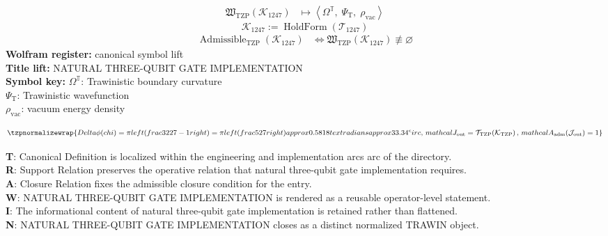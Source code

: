 \noindent
\begin{minipage}[t]{0.48\linewidth}
\begingroup
\small
\[
\begin{aligned}
\mathfrak{W}_{\mathrm{TZP}}\!\left(\mathcal{K}_{1247}\right)
&\longmapsto
\left\langle \Omega^{\mathbb{T}},\; \Psi_{\mathrm{T}},\; \rho_{\mathrm{vac}} \right\rangle
\end{aligned}
\]
\[
\mathcal{K}_{1247}
:=
\operatorname{HoldForm}\!\left(\mathcal{T}_{1247}\right)
\]
\[
\begin{aligned}
\operatorname{Admissible}_{\mathrm{TZP}}\!\left(\mathcal{K}_{1247}\right)
&\Longleftrightarrow
\mathfrak{W}_{\mathrm{TZP}}\!\left(\mathcal{K}_{1247}\right)\not\equiv\varnothing
\end{aligned}
\]
\textbf{Wolfram register:} canonical symbol lift\\
\textbf{Title lift:} NATURAL THREE-QUBIT GATE IMPLEMENTATION\\
\textbf{Symbol key:} \(\Omega^{\mathbb{T}}\): Trawinistic boundary curvature\\ \(\Psi_{\mathrm{T}}\): Trawinistic wavefunction\\ \(\rho_{\mathrm{vac}}\): vacuum energy density
\par
\endgroup
\end{minipage}\hfill
\begin{minipage}[t]{0.48\linewidth}
\[
\tzpnormalizewrap{Delta \phi( chi) = \pi left( frac{32}{27} - 1 right) = \pi left( frac{5}{27} right) approx 0.5818 text{ radians} approx 33.34^ circ,\,mathcal{J}_{\mathrm{out}} = \mathcal{T}_{\mathrm{TZP}}\!\left(\mathcal{K}_{\mathrm{TZP}}\right),\,mathcal{A}_{\mathrm{adm}}\!\left(\mathcal{J}_{\mathrm{out}}\right)=1}
\]

\small
\textbf{T}: Canonical Definition is localized within the engineering and implementation arcs arc of the directory.\\
\textbf{R}: Support Relation preserves the operative relation that natural three-qubit gate implementation requires.\\
\textbf{A}: Closure Relation fixes the admissible closure condition for the entry.\\
\textbf{W}: NATURAL THREE-QUBIT GATE IMPLEMENTATION is rendered as a reusable operator-level statement.\\
\textbf{I}: The informational content of natural three-qubit gate implementation is retained rather than flattened.\\
\textbf{N}: NATURAL THREE-QUBIT GATE IMPLEMENTATION closes as a distinct normalized TRAWIN object.
\normalsize
\end{minipage}

